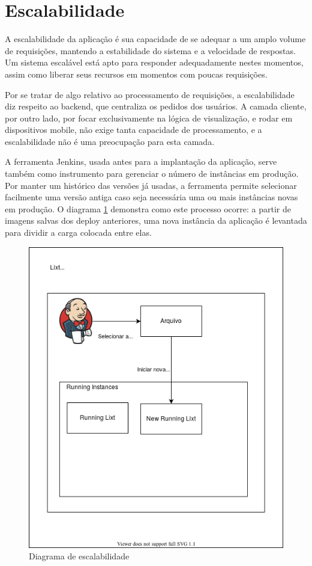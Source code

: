 \section{Escalabilidade}

A escalabilidade da aplicação é sua capacidade de se adequar a um
amplo volume de requisições, mantendo a estabilidade do sistema e a
velocidade de respostas. Um sistema escalável está apto para responder
adequadamente nestes momentos, assim como liberar seus recursos em
momentos com poucas requisições.

Por se tratar de algo relativo ao processamento de requisições, a
escalabilidade diz respeito ao \gls{backend}, que centraliza os
pedidos dos usuários. A camada cliente, por outro lado, por focar
exclusivamente na lógica de visualização, e rodar em dispositivos
mobile, não exige tanta capacidade de processamento, e a
escalabilidade não é uma preocupação para esta camada.

A ferramenta Jenkins, usada antes para a implantação da aplicação,
serve também como instrumento para gerenciar o número de instâncias em
produção. Por manter um histórico das versões já usadas, a ferramenta
permite selecionar facilmente uma versão antiga caso seja necessária
uma ou mais instâncias novas em produção. O diagrama
\ref{fig:escalabilidade} demonstra como este processo ocorre: a
partir de imagens salvas dos \gls{deploy} anteriores, uma nova
instância da aplicação é levantada para dividir a carga colocada entre
elas.

\begin{figure}
  \centering
  \caption{Diagrama de escalabilidade}
  \label{fig:escalabilidade}
  \includegraphics[scale=0.50]{images/escalar}
\end{figure}


